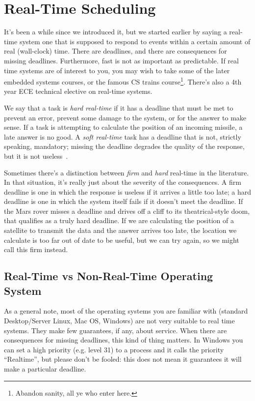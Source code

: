 




\section*{Real-Time Scheduling}
It's been a while since we introduced it, but we started earlier by saying a real-time system one that is supposed to respond to events within a certain amount of real (wall-clock) time. There are deadlines, and there are consequences for missing deadlines. Furthermore, fast is not as important as predictable. If real time systems are of interest to you, you may wish to take some of the later embedded systems courses, or the famous CS trains course\footnote{Abandon sanity, all ye who enter here.}. There's also a 4th year ECE technical elective on real-time systems.

We say that a task is \textit{hard real-time} if it has a deadline that must be met to prevent an error, prevent some damage to the system, or for the answer to make sense. If a task is attempting to calculate the position of an incoming missile, a late answer is no good. A \textit{soft real-time} task has a deadline that is not, strictly speaking, mandatory; missing the deadline degrades the quality of the response, but it is not useless~\cite{osi}.

Sometimes there's a distinction between \textit{firm} and \textit{hard} real-time in the literature. In that situation, it's really just about the severity of the consequences. A firm deadline is one in which the response is useless if it arrives a little too late; a hard deadline is one in which the system itself fails if it doesn't meet the deadline. If the Mars rover misses a deadline and drives off a cliff to its theatrical-style doom, that qualifies as a truly hard deadline. If we are calculating the position of a satellite to transmit the data and the answer arrives too late, the location we calculate is too far out of date to be useful, but we can try again, so we might call this firm instead.

\subsection*{Real-Time vs Non-Real-Time Operating System}

As a general note, most of the operating systems you are familiar with (standard Desktop/Server Linux, Mac OS, Windows) are not very suitable to real time systems. They make few guarantees, if any, about service. When there are consequences for missing deadlines, this kind of thing matters.  In Windows you can set a high priority (e.g. level 31) to a process and it calls the priority ``Realtime'', but please don't be fooled: this does not mean it guarantees it will make a particular deadline.

